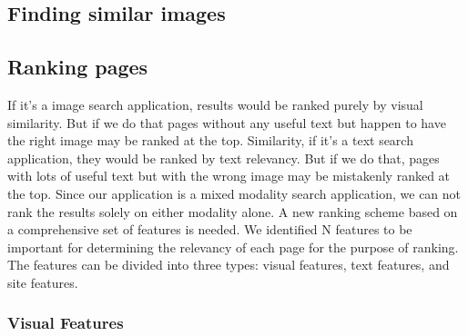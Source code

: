 \documentclass{www2010-submission}
\begin{document}
\subsection{Finding similar images}


\subsection{Ranking pages}

If it's a image search application, results would be ranked purely
by visual similarity. But if we do that pages without any useful
text but happen to have the right image may be ranked at the top.
Similarity, if it's a text search application, they would be
ranked by text relevancy. But if we do that, pages with lots of
useful text but with the wrong image may be mistakenly ranked at
the top. Since our application is a mixed modality search
application, we can not rank the results solely on either modality
alone. A new ranking scheme based on a comprehensive set of
features is needed. We identified N features to be important for
determining the relevancy of each page for the purpose of ranking.
The features can be divided into three types: visual features,
text features, and site features.

\subsubsection{Visual Features}
\end{document}
